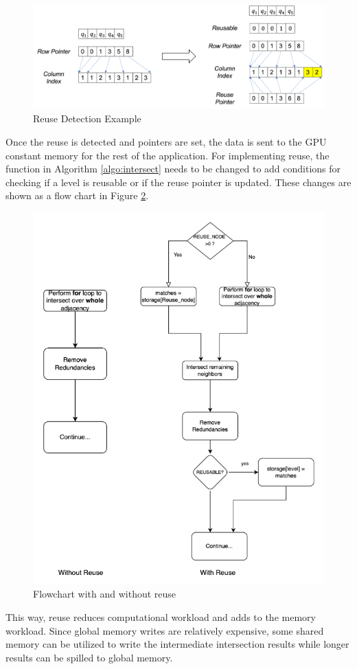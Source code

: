 \begin{figure}
    \includegraphics[width=\textwidth]{fig/improvements/Reuse-resorting.png}
    \caption{Reuse Detection Example}
    \label{fig:reuse-detection}
\end{figure}
Once the reuse is detected and pointers are set, the data is sent to the GPU constant memory for the rest of the application. For implementing reuse, the function in Algorithm \ref{algo:intersect} needs to be changed to add conditions for checking if a level is reusable or if the reuse pointer is updated.
These changes are shown as a flow chart in Figure \ref{fig:reuse-flowchart}.
\begin{figure}
    \includegraphics[width=\textwidth]{fig/improvements/reuse-flow.png}
    \caption{Flowchart with and without reuse}
    \label{fig:reuse-flowchart}
\end{figure}
This way, reuse reduces computational workload and adds to the memory workload.
Since global memory writes are relatively expensive, some shared memory can be utilized to write the intermediate intersection results while longer results can be spilled to global memory.

